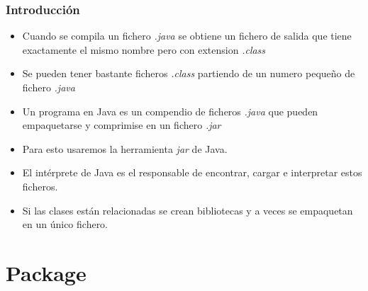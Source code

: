 \documentclass{beamer}
\begin{document}
\begin{frame}
    \frametitle{Introducción}

\begin{itemize}[<+-| alert@+>]
      \item Cuando se compila un fichero \emph{.java} se obtiene un fichero de salida que tiene exactamente el mismo nombre pero con extension \emph{.class}  
      \item Se pueden tener bastante ficheros \emph{.class} partiendo de un numero pequeño de fichero \emph{.java}
      \item Un programa en Java es un compendio de ficheros \emph{.java} que pueden empaquetarse y comprimise en un fichero \emph{.jar}      
      \item Para esto usaremos la herramienta \emph{jar} de Java.
      \item El intérprete de Java es el responsable de encontrar, cargar e interpretar estos ficheros.
      \item Si las clases están relacionadas se crean bibliotecas y a veces se empaquetan en un único fichero.
    \end{itemize}
    \pause
\end{frame}



\section{Package}
\end{document}
